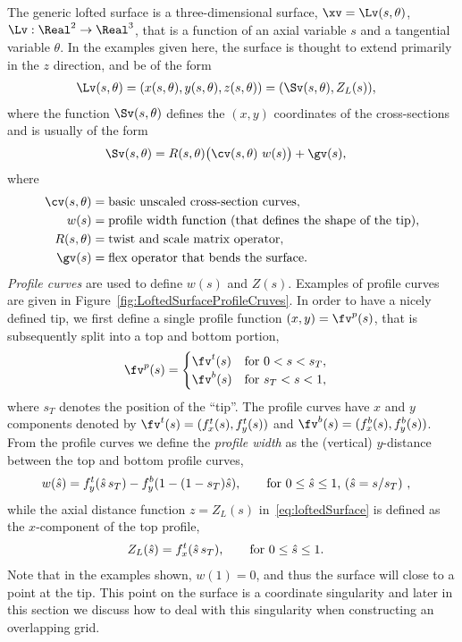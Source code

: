 The generic lofted surface is a three-dimensional surface, $\xv=\Lv(s,\theta)$, $\Lv : \Real^2\rightarrow \Real^3$,
that is a function of an axial variable $s$ and a tangential variable $\theta$. In the examples
given here, the surface is thought to extend primarily in the $z$ direction, and be of the form
\begin{align}
  \Lv(s,\theta) &= (x(s,\theta),y(s,\theta),z(s,\theta)) = ( \Sv(s,\theta), Z_L(s) ),  \label{eq:loftedSurface}
\end{align}
where the function $\Sv(s,\theta)$ defines the $(x,y)$ coordinates of the cross-sections and is usually of the form
\begin{align}
\Sv(s,\theta) &=   R(s,\theta) \big( \cv(s,\theta)~w(s) \big) + \gv(s) ,  \label{eq:loftedSectionCurve}
\end{align}
where 
\begin{align*}
  \cv(s,\theta) & = \text{basic unscaled cross-section curves}, \\
  w(s) &= \text{profile width function (that defines the shape of the tip)}, \\
  R(s,\theta) &= \text{twist and scale matrix operator}, \\
  \gv(s) &= \text{flex operator that bends the surface}.
\end{align*}
{\em Profile curves} are used to define $w(s)$ and $Z(s)$. 
Examples of profile curves are given in Figure~\ref{fig:LoftedSurfaceProfileCruves}.
In order to have a nicely defined
tip, we first define a single profile function $(x,y)= \fv^p(s)$, that is subsequently split into a top and bottom portion, 
 \begin{align*}
  \fv^p(s) &= \begin{cases}
              \fv^t(s) & \text{for $0<s<s_T$}, \\
              \fv^b(s) & \text{for $s_T<s<1$}, 
              \end{cases}
\end{align*}
where $s_T$ denotes the position of the ``tip''. 
The profile curves have $x$ and $y$ components denoted by $\fv^t(s)=(f_x^t(s),f_y^t(s))$ and $\fv^b(s)=(f_x^b(s),f_y^b(s))$.
From the profile curves we define the {\em profile width} as the (vertical) $y$-distance between the top
and bottom profile curves,
 \begin{align*}
  w(\hat{s}) &= f^t_y(\hat{s}\, s_T) - f^b_y(1- (1-s_T)\hat{s}), \qquad \text{for $0 \le \hat{s} \le 1$, ($\hat{s}=s/s_T$) },
\end{align*}
while the axial distance function $z=Z_L(s)$ in~\eqref{eq:loftedSurface} is defined as the $x$-component of the top profile,
 \begin{align*}
    Z_L(\hat{s}) &= f^t_x(\hat{s}\, s_T), \qquad \text{for $0 \le \hat{s} \le 1$}.
\end{align*}
Note that in the examples shown, $w(1)=0$, and thus the surface will close to a point at the tip. This point on the
surface is a coordinate singularity and later in this section we discuss how to deal with this
singularity when constructing an overlapping grid.


